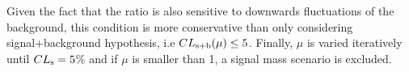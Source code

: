 Given the fact that the ratio is also sensitive to downwards fluctuations of the background, this condition is more conservative than only considering signal+background hypothesis, i.e $CL_{\rm s+b}(\mu)\leq5$.  
Finally, $\mu$ is varied iteratively until  $CL_{\rm s}=5$\% and if $\mu$ is smaller than 1, a signal mass scenario is excluded.
